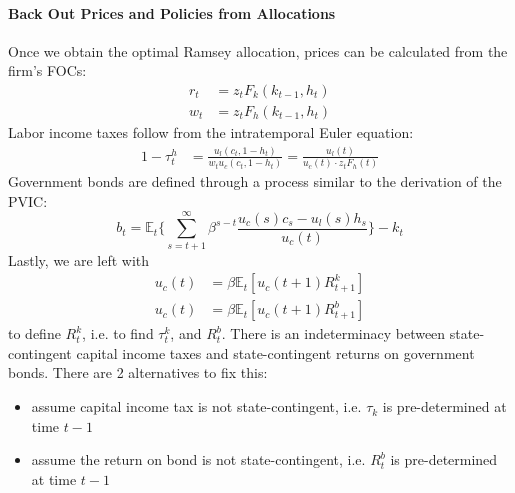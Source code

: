 \documentclass[12pt]{article}
\newcommand{\E}{\mathbb{E}}
\begin{document}
\paragraph{Back Out Prices and Policies from Allocations\\ [6pt]}
		Once we obtain the optimal Ramsey allocation, prices can be calculated from the firm's FOCs:
	\begin{align*}
		r_t &= z_t F_k(k_{t-1}, h_t)\\
		w_t &= z_t F_h(k_{t-1}, h_t)
	\end{align*}
		Labor income taxes follow from the intratemporal Euler equation:
	\begin{align*}
		1 - \tau_t^h &= \frac{u_l(c_t, 1- h_t)}{w_t u_c(c_t, 1- h_t)} = \frac{u_l(t)}{u_c(t) \cdot z_t F_h(t)}
	\end{align*}
		Government bonds are defined through a process similar to the derivation of the PVIC:
	\begin{equation*}
		b_t = \E_t \Bigg\{\sum_{s = t+1}^\infty \beta^{s-t} \frac{u_c(s)c_s - u_l(s)h_s}{u_c(t)} \Bigg\} - k_t
	\end{equation*}
	Lastly, we are left with
	\begin{align*}
		u_c(t) &= \beta \E_t [u_c(t+1)R_{t+1}^k]\\
		u_c(t) &= \beta \E_t [u_c(t+1)R_{t+1}^b]
	\end{align*}
	to define $R_t^k$, i.e. to find $\tau_t^k$, and $R_t^b$. There is an indeterminacy between state-contingent capital income taxes and state-contingent returns on government bonds. There are 2 alternatives to fix this:
	\begin{itemize}
		\item assume capital income tax is not state-contingent, i.e. $\tau_k$ is pre-determined at time $t-1$
		\item assume the return on bond is not state-contingent, i.e. $R_t^b$ is pre-determined at time $t-1$
	\end{itemize}
	
\end{document}
